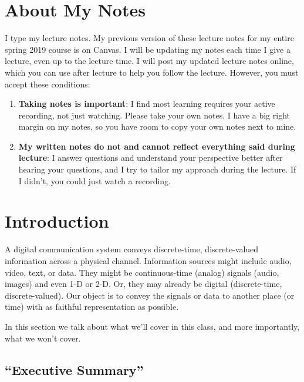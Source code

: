 



\section{About My Notes}


I type my lecture notes.  My previous version of these lecture notes for my entire spring 2019 course is on Canvas.  I will be updating my notes each time I give a lecture, even up to the lecture time.   I will post my updated lecture notes online, which you can use after lecture to help you follow the lecture.  However, you must accept these conditions:
\begin{enumerate}
 \item \textbf{Taking notes is important}: I find most learning requires your active recording, not just watching.  Please take your own notes.  I have a big right margin on my notes, so you have room to copy your own notes next to mine.
 \item \textbf{My written notes do not and cannot reflect everything said during lecture}:  I answer questions and understand your perspective better after hearing your questions, and I try to tailor my approach during the lecture.  If I didn't, you could just watch a recording.
\end{enumerate}


\section{Introduction}

A digital communication system conveys discrete-time,
discrete-valued information across a physical channel.  Information
sources might include audio, video, text, or data.  They might be
continuous-time (analog) signals (audio, images) and even 1-D or
2-D.  Or, they may already be digital (discrete-time,
discrete-valued).  Our object is to convey the signals or data to
another place (or time) with as faithful representation as possible.

In this section we talk about what we'll cover in this class, and
more importantly, what we won't cover.

\subsection{``Executive Summary''}

